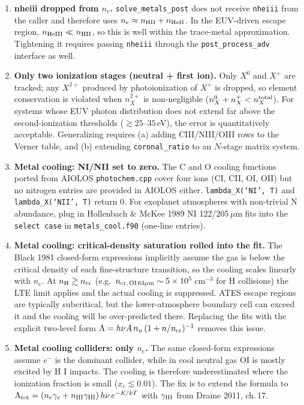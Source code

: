 \documentclass[english,a4paper]{kiseon_memo}
\begin{document}
\begin{enumerate}
\item \textbf{nheiii dropped from $n_e$.} \texttt{solve\_metals\_post} does
not receive \texttt{nheiii} from the caller and therefore uses
$n_e \approx n_{\rm HII} + n_{\rm HeII}$. In the EUV-driven escape region,
$n_{\rm HeIII} \ll n_{\rm HII}$, so this is well within the trace-metal
approximation. Tightening it requires passing \texttt{nheiii} through the
\texttt{post\_process\_adv} interface as well.

\item \textbf{Only two ionization stages (neutral + first ion).} Only $X^0$
and $X^+$ are tracked; any $X^{2+}$ produced by photoionization of $X^+$
is dropped, so element conservation is violated when $n_X^{2+}$ is
non-negligible ($n_X^0 + n_X^+ < n_X^{\rm total}$). For systems whose EUV
photon distribution does not extend far above the second-ionization
thresholds ($\gtrsim 25$--$35\,$eV), the error is quantitatively acceptable.
Generalizing requires (a) adding CIII/NIII/OIII rows to the Verner table,
and (b) extending \texttt{coronal\_ratio} to an $N$-stage matrix system.

\item \textbf{Metal cooling: NI/NII set to zero.} The C and O cooling
functions ported from AIOLOS \texttt{photochem.cpp} cover four ions
(CI, CII, OI, OII) but no nitrogen entries are provided in AIOLOS
either. \texttt{lambda\_X(`NI', T)} and \texttt{lambda\_X(`NII', T)}
return 0. For exoplanet atmospheres with non-trivial N abundance,
plug in Hollenbach \& McKee 1989 NI 122/205\,$\mu$m fits into the
\texttt{select case} in \texttt{metals\_cool.f90} (one-line entries).

\item \textbf{Metal cooling: critical-density saturation rolled into
the fit.} The Black 1981 closed-form expressions implicitly assume
the gas is below the critical density of each fine-structure
transition, so the cooling scales linearly with $n_e$. At
$n_{\rm H} \gtrsim n_{\rm cr}$ (e.g.\ $n_{\rm cr,\,OI\,63\mu m}
\sim 5\times 10^5\,$cm$^{-3}$ for H collisions) the LTE limit
applies and the actual cooling is suppressed. ATES escape regions are
typically subcritical, but the lower-atmosphere boundary cell can
exceed it and the cooling will be over-predicted there. Replacing
the fits with the explicit two-level form
$\Lambda = h\nu A\,n_u\,(1 + n/n_{\rm cr})^{-1}$ removes this issue.

\item \textbf{Metal cooling colliders: only $n_e$.} The same
closed-form expressions assume $e^-$ is the dominant collider, while
in cool neutral gas OI is mostly excited by H I impacts. The cooling
is therefore underestimated where the ionization fraction is small
($x_e \lesssim 0.01$). The fix is to extend the formula to
$\Lambda_{\rm tot} = (n_e \gamma_e + n_{\rm HI} \gamma_{\rm HI})\,h\nu\,e^{-E/kT}$
with $\gamma_{\rm HI}$ from Draine 2011, ch.\,17.


\end{enumerate}
\end{document}
